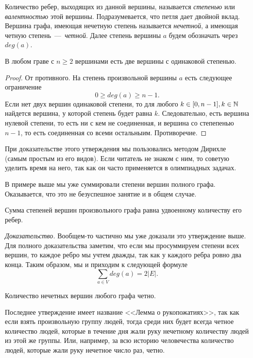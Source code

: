 \begin{definition}
	Количество ребер, выходящих из данной вершины, называется \emph{степенью} или \emph{валентностью} этой вершины. 
	Подразумевается, что петля дает двойной вклад. Вершина графа, имеющая нечетную степень называется \emph{нечетной}, 
	а имеющая четную степень~---~\emph{четной}. Далее степень вершины $a$ будем обозначать через $deg(a)$.
\end{definition}

\begin{statement}
	В любом граве с $n \geqslant 2$ вершинами есть две вершины с одинаковой степенью.
	
\begin{proof}
	От противного. На степень произвольной вершины $a$ есть следующее ограничение
	$$0 \geqslant deg (a) \geqslant n-1.$$
	Если нет двух вершин одинаковой степени, то для любого $k \in [0, n-1], k \in \mathbb{N}$ найдется вершина,
	у которой степень будет равна $k$. Следовательно, есть вершина нулевой степени, то есть ни с кем не соединенная,
	и вершина со степепенью $n-1$, то есть соединенная со всеми остальныим. Противоречие.
\end{proof}
\end{statement}

	При доказательстве этого утверждения мы пользовались методом Дирихле (самым простым из его видов). Если читатель не знаком с ним,
	то советую уделить время на него, так как он часто применяется в олимпиадных задачах.

	В примере выше мы уже суммировали степени вершин полного графа. Оказывается, что это не безуспешное занятие и в общем случае.

\begin{lemma}[о рукопожатиях]
	Сумма степеней вершин произвольного графа равна удвоенному количеству его ребер.
	
	\emph{Доказательство.} Вообщем-то частично мы уже доказали это утверждение выше. Для полного доказательства заметим, что если 
	мы просуммируем степени всех вершин, то каждое ребро мы учтем дважды, так как у каждого ребра ровно два конца. 
	Таким образом, мы и приходим к следующей формуле $$\sum_{a \in V} deg(a) = 2|E|.$$
\end{lemma}

\begin{consequence}
	Количество нечетных вершин любого графа четно.
\end{consequence}

	Последнее утверждение имеет название <<Лемма о рукопожатиях>>, так как если взять произвольную группу людей, тогда 
	среди них будет всегда четное количество людей, которые в течение дня жали руку нечетному количеству людей из этой же группы. 
	Или, например, за всю историю человечества количество людей, которые жали руку нечетное число раз, четно.

